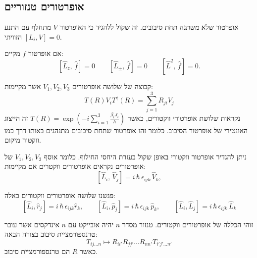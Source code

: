 \documentclass{tstextbook}
\begin{document}
\subsection{אופרטורים טנזוריים}

\begin{definition}
אופרטור שלא משתנה תחת סיבובים. זה שקול ללהגיד כי האופרטור \(V\)  מתחלף עם התנע הזוויתי \([L_{i},V]=0\).

\end{definition}
\begin{proposition}
אם אופרטור \(f\) מקיים:
$${{\left[\hat{L}_{z},\,\hat{f}\right]=0}}\qquad {{\left[\hat{L}_{\pm},\,\hat{f}\right]=0}} \qquad {{\left[\hat{L}^{2},\,\hat{f}\right]=0.}}$$

\end{proposition}
\begin{definition}
קבוצה של שלושה אופרטורים \(V_{1},V_{2},V_{3}\) אשר מקיימות:
$$T(R)V_{i}T^{\dagger}(R)=\sum_{j=1}^{3}R_{j i}V_{j}$$
נקראות שלושת אופרטורי ווקטורים, כאשר \(T(R)=\exp\left( -i\sum_{i=1}^{3}\frac{\beta_{i}J_{i}}{\hbar} \right)\) זה הייצוג האונטירי של אופרטור הסיבוב. כלומר זהו אופרטור שתחת סיבובים מתנהגים באותו דרך כמו ווקטור מיקום. 

\end{definition}
\begin{proposition}
ניתן להגדיר אופרטור ווקטורי באופן שקול בעזרת היחסי החילוף. כלומר אוסף \(V_{1},V_{2},V_{3}\) של אופרטורים נקראים אופרטורים ווקטרים אם מקיימות:
$$\left[\hat{L}_{i},\,\hat{V}_{j}\right]=i\,\hbar\,\epsilon_{i j k}\,\hat{V}_{k},$$

\end{proposition}
\begin{example}
פגשנו שלושה אופרטורים ווקטורים כאלה:
$$\left[\hat{L}_{i},\hat{r}_{j}\right]=i\,\hbar\,\epsilon_{i j k}\hat{r}_{k},\qquad\left[\hat{L}_{i},\hat{p}_{j}\right]=i\,\hbar\,\epsilon_{i j k}\,\hat{p}_{k},\qquad\left[\hat{L}_{i},\hat{L}_{j}\right]=i\,\hbar\,\epsilon_{i j k}\,\hat{L}_{k}$$

\end{example}
\begin{definition}
זוהי הכללה של אופרטורים ווקטורים. טנזור מסדר \(n\) יהיה אובייקט עם \(n\) אינדקסים אשר עובר טרנספורמציית סיבוב בצורה הבאה:
$$T_{ij \dots n}\mapsto R_{ii'}R_{jj'} \dots R_{nn'} T_{i' j' \dots n'}$$
כאשר \(R\) הם טרנספורמציית סיבוב.

\end{definition}
\end{document}
